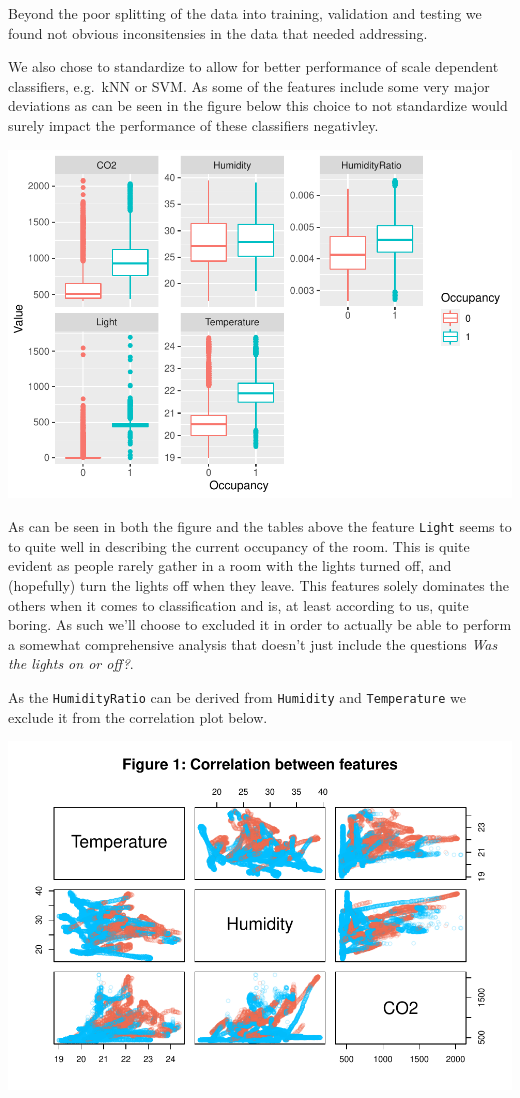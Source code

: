 \documentclass[
]{article}
\begin{document}
Beyond the poor splitting of the data into training, validation and
testing we found not obvious inconsitensies in the data that needed
addressing.

We also chose to standardize to allow for better performance of scale
dependent classifiers, e.g.~kNN or SVM. As some of the features include
some very major deviations as can be seen in the figure below this
choice to not standardize would surely impact the performance of these
classifiers negativley.

\includegraphics{Assignment-4_files/figure-latex/unnamed-chunk-2-1.pdf}

As can be seen in both the figure and the tables above the feature
\texttt{Light} seems to to quite well in describing the current
occupancy of the room. This is quite evident as people rarely gather in
a room with the lights turned off, and (hopefully) turn the lights off
when they leave. This features solely dominates the others when it comes
to classification and is, at least according to us, quite boring. As
such we'll choose to excluded it in order to actually be able to perform
a somewhat comprehensive analysis that doesn't just include the
questions \emph{Was the lights on or off?}.

As the \texttt{HumidityRatio} can be derived from \texttt{Humidity} and
\texttt{Temperature} we exclude it from the correlation plot below.

\includegraphics{Assignment-4_files/figure-latex/unnamed-chunk-3-1.pdf}
\end{document}
